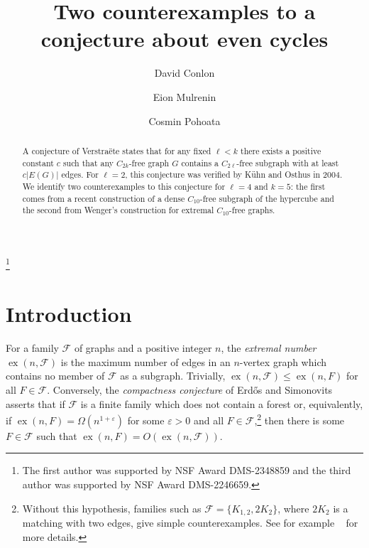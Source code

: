 \documentclass[A4paper,reqno,oneside,11pt]{amsart}
\theoremstyle{plain}
\theoremstyle{definition}
\newcommand{\scF}{\mathscr{F}}
\newcommand{\ex}{\operatorname{ex}}
\def\l{\ell}
\def\ve{\varepsilon}
\begin{document}

\title{Two counterexamples to a conjecture about even cycles}

\author{David Conlon}
\address{Department of Mathematics, California Institute of Technology, Pasadena, CA 91125, USA}

\author{Eion Mulrenin}
\address{Department of Mathematics, Emory University, Atlanta, GA 30322, USA}

\author{Cosmin Pohoata}
\address{Department of Mathematics, Emory University, Atlanta, GA 30322, USA}

\thanks{The first author was supported by NSF Award DMS-2348859 and the third author was supported by NSF Award DMS-2246659.}

\begin{abstract}
A conjecture of Verstra\"ete states that for any fixed $\l < k$ there exists a positive constant $c$ such that any $C_{2k}$-free graph $G$ contains a $C_{2\l}$-free subgraph with at least $c |E(G)|$ edges. 
For $\l = 2$, this conjecture was verified by K\"uhn and Osthus in 2004. 
We identify two counterexamples to this conjecture for $\l = 4$ and $k=5$: the first comes from a recent construction of a dense $C_{10}$-free subgraph of the hypercube and the second from Wenger's construction for extremal $C_{10}$-free graphs.
\end{abstract}

\maketitle


\section{Introduction}

For a family $\scF$ of graphs and a positive integer $n$, the {\it extremal number} $\ex(n,\scF)$ is the maximum number of edges in an $n$-vertex graph which contains no member of $\scF$ as a subgraph.
Trivially, $\ex(n,\scF) \leq \ex(n,F)$ for all $F \in \scF$. Conversely, the {\it compactness conjecture} of Erd\H{o}s and Simonovits~\cite{ES82} asserts that if $\scF$ is a finite family which does not contain a forest or, equivalently, if $\ex(n,F) = \Omega(n^{1+\ve})$ for some $\ve > 0$ and all $F \in \scF$,\footnote{Without this hypothesis, families such as $\scF = \{K_{1,2}, 2K_2\}$, where $2K_2$ is a matching with two edges, give simple counterexamples. See for example ~\cite{Wig} for more details.} then there is some $F \in \scF$ such that $\ex(n,F) = O(\ex(n,\scF))$.
\end{document}
